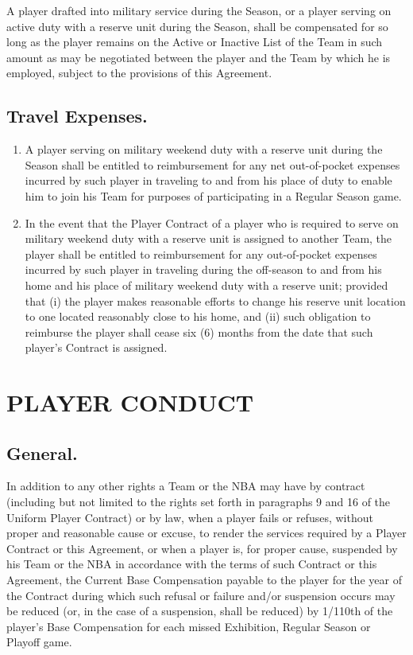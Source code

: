 \documentclass[
]{book}
\providecommand{\tightlist}{%
  \setlength{\itemsep}{0pt}\setlength{\parskip}{0pt}}
\begin{document}
A player drafted into military service during the Season, or a player serving on active duty with a reserve unit during the Season, shall be compensated for so long as the player remains on the Active or Inactive List of the Team in such amount as may be negotiated between the player and the Team by which he is employed, subject to the provisions of this Agreement.

\hypertarget{travel-expenses.}{%
\section{Travel Expenses.}\label{travel-expenses.}}

\begin{enumerate}
\def\labelenumi{(\alph{enumi})}
\tightlist
\item
  A player serving on military weekend duty with a reserve unit during the Season shall be entitled to reimbursement for any net out-of-pocket expenses incurred by such player in traveling to and from his place of duty to enable him to join his Team for purposes of participating in a Regular Season game.
\item
  In the event that the Player Contract of a player who is required to serve on military weekend duty with a reserve unit is assigned to another Team, the player shall be entitled to reimbursement for any out-of-pocket expenses incurred by such player in traveling during the off-season to and from his home and his place of military weekend duty with a reserve unit; provided that (i) the player makes reasonable efforts to change his reserve unit location to one located reasonably close to his home, and (ii) such obligation to reimburse the player shall cease six (6) months from the date that such player's Contract is assigned.
\end{enumerate}

\hypertarget{player-conduct}{%
\chapter{PLAYER CONDUCT}\label{player-conduct}}

\hypertarget{general.-1}{%
\section{General.}\label{general.-1}}

In addition to any other rights a Team or the NBA may have by contract (including but not limited to the rights set forth in paragraphs 9 and 16 of the Uniform Player Contract) or by law, when a player fails or refuses, without proper and reasonable cause or excuse, to render the services required by a Player Contract or this Agreement, or when a player is, for proper cause, suspended by his Team or the NBA in accordance with the terms of such Contract or this Agreement, the Current Base Compensation payable to the player for the year of the Contract during which such refusal or failure and/or suspension occurs may be reduced (or, in the case of a suspension, shall be reduced) by 1/110th of the player's Base Compensation for each missed Exhibition, Regular Season or Playoff game.
\end{document}
